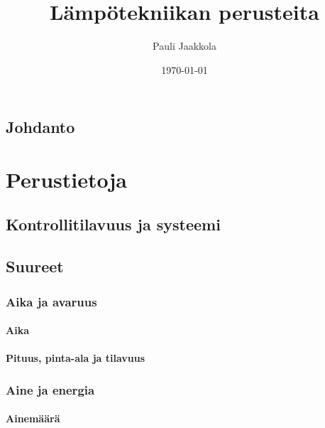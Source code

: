 \documentclass[12pt,a4paper,finnish]{book}
\title{Lämpötekniikan perusteita}
\date{\today}
\author{Pauli Jaakkola}
\begin{document}
\maketitle
\newpage
{}
\tableofcontents
\newpage
{}

\chapter{Johdanto}

\part{Perustietoja} %

\chapter{Kontrollitilavuus ja systeemi} %

\chapter{Suureet} %

\section{Aika ja avaruus}

\subsection{Aika}

\subsection{Pituus, pinta-ala ja tilavuus}

\section{Aine ja energia}

\subsection{Ainemäärä}
\end{document}
